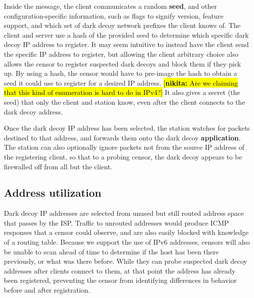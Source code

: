 \documentclass[letterpaper,twocolumn,10pt]{article}
\newcommand{\note}[2]{\hl{[\textbf{#1:} #2]}\xspace}
\newcommand{\nikita}[1]{\note{nikita}{#1}}
\begin{document}
Inside the message, the client communicates a random \textbf{seed}, and other
configuration-specific information, such as flags to signify version, feature
support, and which set of dark decoy network prefixes the client knows of. The
client and server use a hash of the provided seed to determine which specific
dark decoy IP address to register. It may seem intuitive to instead have the client
send the specific IP address to register, but allowing the client arbitrary
choice also allows the censor to register suspected dark decoys and block them if
they pick up. By using a hash, the censor would have to pre-image the hash to
obtain a seed it could use to register for a desired IP address. \nikita{Are we claiming that this kind of enumeration is hard to do in IPv4?} It also gives a
secret (the seed) that only the client and station know, even after the client
connects to the dark decoy address.

Once the dark decoy IP address has been selected, the station watches for
packets destined to that address, and forwards them onto the dark decoy
\textbf{application}. The station can also optionally ignore packets not from
the source IP address of the registering client, so that to a probing censor,
the dark decoy appears to be firewalled off from all but the client.


\subsection{Address utilization}

Dark decoy IP addresses are selected from unused but still routed address
space that passes by the ISP. Traffic to unrouted addresses would produce ICMP
responses that a censor could observe, and are also easily blocked with knowledge
of a routing table. Because we support the use of IPv6 addresses, censors will
also be unable to scan ahead of time to determine if the host has been there
previously, or what was there before. While they can probe suspected dark decoy
addresses after clients connect to them, at that point the address has already been
registered, preventing the censor from identifying differences in behavior
before and after registration.
\end{document}
